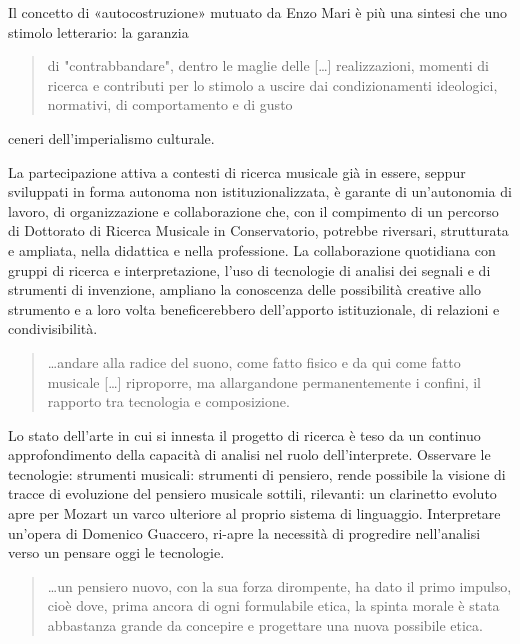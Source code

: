 \documentclass{gs-adonis}
\begin{document}
Il concetto di «autocostruzione» mutuato da Enzo Mari \cite{mari2002} è più una
sintesi che uno stimolo letterario: la garanzia

\begin{quote}
  di "contrabbandare", dentro le maglie delle […] realizzazioni, momenti di
  ricerca e contributi per lo stimolo a uscire dai condizionamenti ideologici,
  normativi, di comportamento e di gusto
\end{quote}

ceneri dell'imperialismo culturale.

La partecipazione attiva a contesti di ricerca musicale già in essere, seppur
sviluppati in forma autonoma non istituzionalizzata, è garante di un'autonomia
di lavoro, di organizzazione e collaborazione che, con il compimento di un
percorso di Dottorato di Ricerca Musicale in Conservatorio, potrebbe riversari,
strutturata e ampliata, nella didattica e nella professione. La collaborazione
quotidiana con gruppi di ricerca e interpretazione, l'uso di tecnologie di
analisi dei segnali e di strumenti di invenzione, ampliano la conoscenza
delle possibilità creative allo strumento e a loro volta beneficerebbero
dell'apporto istituzionale, di relazioni e condivisibilità.


\begin{quote}
  …andare alla radice del suono, come fatto fisico e da qui come fatto musicale […] riproporre, ma allargandone permanentemente i confini, il rapporto tra tecnologia e composizione.
\end{quote}

Lo stato dell'arte in cui si innesta il progetto di ricerca è teso da un continuo
approfondimento della capacità di analisi nel ruolo dell'interprete.
Osservare le tecnologie: strumenti musicali: strumenti di pensiero, rende possibile
la visione di tracce di evoluzione del pensiero musicale sottili, rilevanti:
un clarinetto evoluto apre per Mozart un varco ulteriore al proprio
sistema di linguaggio.
Interpretare un'opera di Domenico Guaccero, ri-apre la necessità di progredire
nell'analisi verso un pensare oggi le tecnologie.

\begin{quote}
  \ldots un pensiero nuovo, con la sua forza dirompente, ha dato il primo impulso,
  cioè dove, prima ancora di ogni formulabile etica, la spinta morale è stata
  abbastanza grande da concepire e progettare una nuova possibile etica.
\end{quote}
\end{document}
